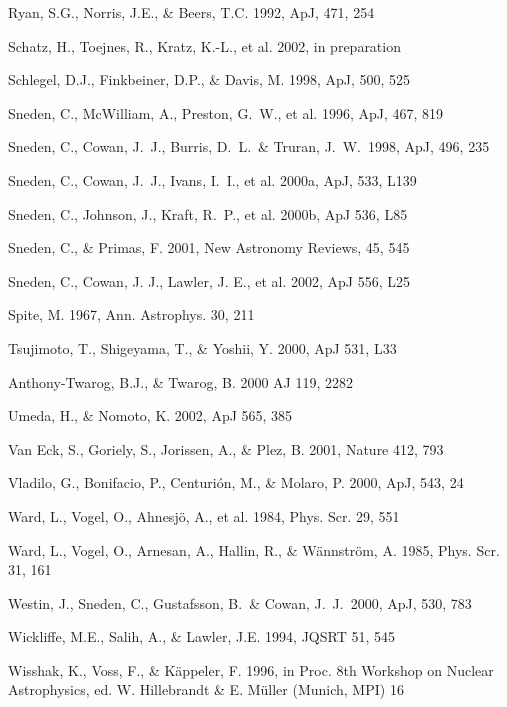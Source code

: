 \documentclass{aa}
\begin{document}
\begin{thebibliography}{}
     Ryan, S.G., Norris, J.E., \& Beers, T.C. 1992,
ApJ, 471, 254

     Schatz, H., Toejnes, R., Kratz, K.-L., et
    al. 2002, in preparation
    
      Schlegel, D.J., Finkbeiner, D.P., \& Davis,
    M. 1998, ApJ, 500, 525  
    
     Sneden, C., McWilliam,
A., Preston, G.\ W., et al. 1996, ApJ, 467, 819

Sneden, C., Cowan, J.\ J., Burris, D.\ L.\ \& Truran, J.\ W.\ 1998, ApJ,
496, 235

     Sneden, C., Cowan, J.\
J., Ivans, I.\ I., et al. 2000a, ApJ, 533, L139

    Sneden, C., Johnson, J., Kraft, R.\ P.,
   et al. 2000b, ApJ 536, L85

     Sneden, C., \& Primas, F. 2001, New
    Astronomy Reviews, 45, 545

     Sneden, C., Cowan, J. J., Lawler, J. E.,
    et al. 2002, ApJ 556, L25

     Spite, M. 1967, Ann. Astrophys. 30, 211

     Tsujimoto, T., Shigeyama, T., \& Yoshii, 
    Y. 2000, ApJ 531, L33
    
     Anthony-Twarog, B.J., \& Twarog, B. 2000
    AJ 119, 2282

     Umeda, H., \& Nomoto, K. 2002, ApJ 565, 385

     Van Eck, S., Goriely, S., Jorissen, A., 
    \& Plez, B. 2001, Nature 412, 793

     Vladilo, G., Bonifacio, P., Centuri\'on,
    M., \& Molaro, P. 2000, ApJ, 543, 24

     Ward, L., Vogel, O., Ahnesj\"o, A., et
    al. 1984, Phys. Scr. 29, 551 
 
     Ward, L., Vogel, O., Arnesan, A., Hallin, R.,
    \& W\"annstr\"om, A. 1985, Phys. Scr. 31, 161 

     Westin, J., Sneden, C., Gustafsson, B.\
    \& Cowan, J.\ J.\ 2000, ApJ, 530, 783

    Wickliffe, M.E., Salih, A., \& Lawler,
    J.E. 1994, JQSRT 51, 545  

     Wisshak, K., Voss, F., \& K\"appeler, F. 1996, in
    Proc. 8th Workshop on Nuclear Astrophysics, ed. W. Hillebrandt \&
    E. M\"uller (Munich, MPI) 16 

\end{thebibliography}
\end{document}
